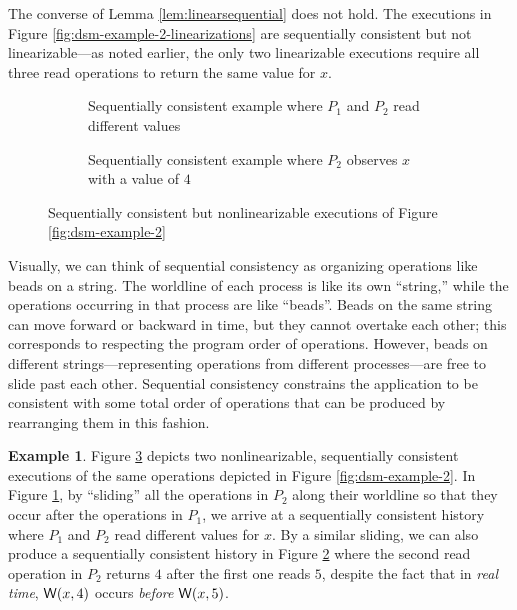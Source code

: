 \documentclass[]             %
{NASA}                       %
\theoremstyle{definition}
\newtheorem{example}[theorem]{Example}
\begin{document}
The converse of Lemma \ref{lem:linearsequential} does not hold. The
executions in Figure \ref{fig:dsm-example-2-linearizations} are
sequentially consistent but not linearizable---as noted earlier, the
only two linearizable executions require all three read operations to
return the same value for $x$.

\begin{figure}
  \begin{subfigure}{1\textwidth}
    \setlength\belowcaptionskip{4ex}
    \centering
    
    \caption{Sequentially consistent example where $P_1$ and $P_2$ read different values}
    \label{fig:dsm-example-2-sequential-1}
  \end{subfigure}
  \begin{subfigure}{1\textwidth}
    
    \caption{Sequentially consistent example where $P_2$ observes $x$ with a value of $4$}
    \label{fig:dsm-example-2-sequential-2}
  \end{subfigure}
  \caption{Sequentially consistent but nonlinearizable executions of Figure \ref{fig:dsm-example-2}}
  \label{fig:dsm-example-2-sequential}
\end{figure}

Visually, we can think of sequential consistency as organizing
operations like beads on a string. The worldline of each process is
like its own ``string,'' while the operations occurring in that
process are like ``beads''. Beads on the same string can move forward
or backward in time, but they cannot overtake each other; this
corresponds to respecting the program order of operations. However,
beads on different strings---representing operations from different
processes---are free to slide past each other. Sequential consistency
constrains the application to be consistent with some total order of
operations that can be produced by rearranging them in this fashion.

\begin{example}
  Figure \ref{fig:dsm-example-2-sequential} depicts two
  nonlinearizable, sequentially consistent executions of the same
  operations depicted in Figure \ref{fig:dsm-example-2}. In Figure
  \ref{fig:dsm-example-2-sequential-1}, by ``sliding'' all the
  operations in $P_2$ along their worldline so that they occur after
  the operations in $P_1$, we arrive at a sequentially consistent
  history where $P_1$ and $P_2$ read different values for $x$. By a
  similar sliding, we can also produce a sequentially consistent
  history in Figure \ref{fig:dsm-example-2-sequential-2} where the
  second read operation in $P_2$ returns $4$ after the first one reads
  $5$, despite the fact that in \emph{real time}, $\mathsf{W}\!\left(x, 4\right)$
  occurs \emph{before} $\mathsf{W}\!\left(x, 5\right)$.
\end{example}
\end{document}
